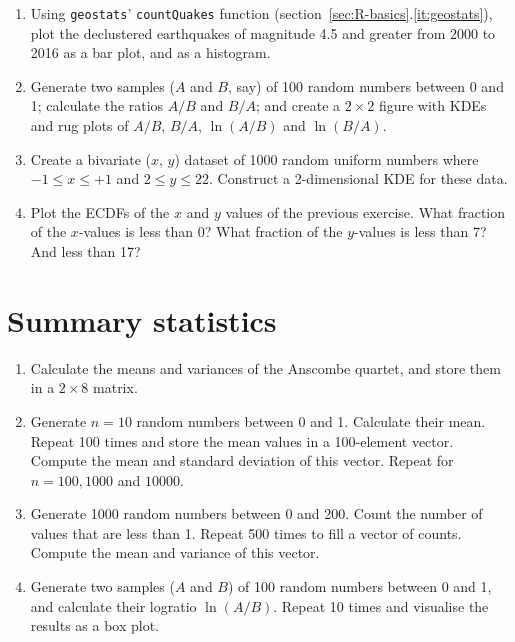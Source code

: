\begin{enumerate}
  
\item Using \texttt{geostats}' \texttt{countQuakes} function
  (section~\ref{sec:R-basics}.\ref{it:geostats}), plot the declustered
  earthquakes of magnitude 4.5 and greater from 2000 to 2016 as a bar
  plot, and as a histogram.

\item\label{it:AB} Generate two samples ($A$ and $B$, say) of 100
  random numbers between 0 and 1; calculate the ratios $A/B$ and
  $B/A$; and create a ${2}\times{2}$ figure with KDEs and rug plots of
  $A/B$, $B/A$, $\ln(A/B)$ and $\ln(B/A)$.
  
\item\label{it:randxy} Create a bivariate ($x$, $y$) dataset of 1000
  random uniform numbers where $-1\leq{x}\leq{+1}$ and
  $2\leq{y}\leq{22}$. Construct a 2-dimensional KDE for these data.
  
\item Plot the ECDFs of the $x$ and $y$ values of the previous
  exercise. What fraction of the $x$-values is less than 0?  What
  fraction of the $y$-values is less than 7? And less than 17?

\end{enumerate}

\section{Summary statistics}
\label{sec:ex-summary-statistics}

\begin{enumerate}
  
\item Calculate the means and variances of the Anscombe quartet, and
  store them in a ${2}\times{8}$ matrix.

\item Generate $n=10$ random numbers between 0 and 1. Calculate their
  mean. Repeat 100 times and store the mean values in a 100-element
  vector. Compute the mean and standard deviation of this vector.
  Repeat for $n=100, 1000$ and $10000$.

\item Generate 1000 random numbers between 0 and 200. Count the number
  of values that are less than 1. Repeat 500 times to fill a vector of
  counts. Compute the mean and variance of this vector.
  
\item Generate two samples ($A$ and $B$) of 100 random numbers between
  0 and 1, and calculate their logratio $\ln(A/B)$. Repeat 10 times
  and visualise the results as a box plot.

\end{enumerate}

